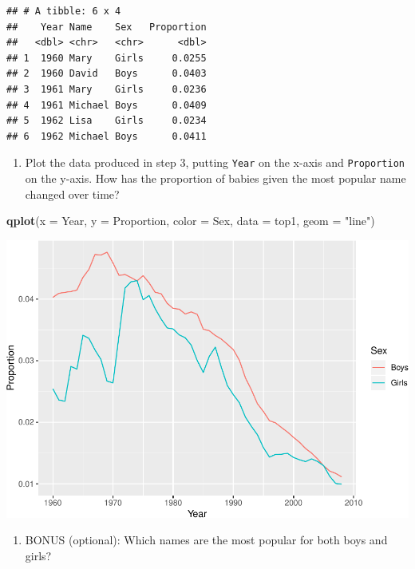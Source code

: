 \documentclass[]{book}
\newenvironment{Shaded}{\begin{snugshade}}{\end{snugshade}}
\newcommand{\KeywordTok}[1]{\textcolor[rgb]{0.13,0.29,0.53}{\textbf{#1}}}
\newcommand{\DataTypeTok}[1]{\textcolor[rgb]{0.13,0.29,0.53}{#1}}
\newcommand{\StringTok}[1]{\textcolor[rgb]{0.31,0.60,0.02}{#1}}
\newcommand{\NormalTok}[1]{#1}
\providecommand{\tightlist}{%
  \setlength{\itemsep}{0pt}\setlength{\parskip}{0pt}}
\begin{document}
\begin{verbatim}
## # A tibble: 6 x 4
##    Year Name    Sex   Proportion
##   <dbl> <chr>   <chr>      <dbl>
## 1  1960 Mary    Girls     0.0255
## 2  1960 David   Boys      0.0403
## 3  1961 Mary    Girls     0.0236
## 4  1961 Michael Boys      0.0409
## 5  1962 Lisa    Girls     0.0234
## 6  1962 Michael Boys      0.0411
\end{verbatim}

\begin{enumerate}
\def\labelenumi{\arabic{enumi}.}
\setcounter{enumi}{3}
\tightlist
\item
  Plot the data produced in step 3, putting \texttt{Year} on the x-axis
  and \texttt{Proportion} on the y-axis. How has the proportion of
  babies given the most popular name changed over time?
\end{enumerate}

\begin{Shaded}
\begin{Highlighting}[]
\KeywordTok{qplot}\NormalTok{(}\DataTypeTok{x =}\NormalTok{ Year, }
      \DataTypeTok{y =}\NormalTok{ Proportion, }
      \DataTypeTok{color =}\NormalTok{ Sex, }
      \DataTypeTok{data =}\NormalTok{ top1, }
      \DataTypeTok{geom =} \StringTok{"line"}\NormalTok{)}
\end{Highlighting}
\end{Shaded}

\includegraphics{R/Rintro/figures/unnamed-chunk-75-1.pdf}

\begin{enumerate}
\def\labelenumi{\arabic{enumi}.}
\setcounter{enumi}{4}
\tightlist
\item
  BONUS (optional): Which names are the most popular for both boys and
  girls?
\end{enumerate}
\end{document}
